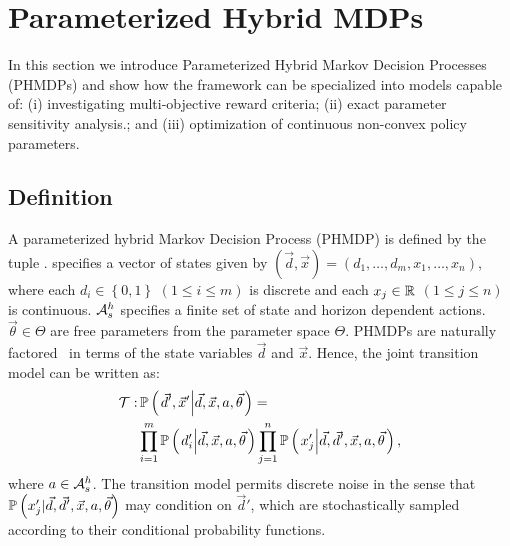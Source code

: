 \section{Parameterized Hybrid MDPs}
\label{sec:hybrid_mdps}

In this section we introduce Parameterized Hybrid Markov Decision Processes (PHMDPs) and show how the framework can be specialized into models capable of: (i) investigating multi-objective reward criteria; (ii) exact parameter sensitivity analysis.; and (iii) optimization of continuous non-convex policy parameters. 

\subsection{Definition}
\label{sec:phmdp_def}

A parameterized hybrid Markov Decision Process (PHMDP) is defined by the tuple {\footnotesize \PMDPTuple}. {\footnotesize \State} specifies a vector of states given by {\footnotesize $(\vec{d}, \vec{x}) =  \left( d_1, \ldots, d_m, x_1, \ldots, x_n \right) $}, where each {\footnotesize $ d_i \in \left\lbrace 0, 1 \right\rbrace $} {\footnotesize $\left( 1 \leq i \leq m \right)$} is discrete and each {\footnotesize$ x_j \in \mathbb{R} $} {\footnotesize $\left( 1 \leq j \leq   n \right)$} is continuous. {\footnotesize $\mathcal{A}^{h}_{s}$} specifies a finite set of state and horizon dependent actions.  {\footnotesize $\vec{\theta} \in \Theta$} are free parameters from the parameter space {\footnotesize $ \Theta $}. PHMDPs are naturally factored~\parencite{Boutilier_JAIR_1999} in terms of the state variables {\footnotesize$\vec{d}$} and {\footnotesize
$\vec{x}$}. Hence, the joint transition model can be written as:
{\footnotesize
\abovedisplayskip=0pt
\belowdisplayskip=0pt
\begin{align}
    \label{eq:hmdp_tfunc}
    \mathcal{T} :& \, \mathbb{P}\left({ \left. \vec{d}', \vec{x}' \middle| \vec{d}, \vec{x}, a, \vec{\theta} \right.}\right) = \nonumber \\
    & \prod_{i=1}^{m} \mathbb{P}\left({ \left. d_i' \middle| \vec{d}, \vec{x}, a, \vec{\theta} \right. }\right) \prod_{j=1}^{n} \mathbb{P}\left({ \left. x_j' \middle| \vec{d}, \vec{d}', \vec{x}, a, \vec{\theta} \right. }\right),
\end{align}   
}
where {\footnotesize $ a \in \mathcal{A}^{h}_{s} $}. The transition model permits discrete noise in the sense that {\footnotesize $ \mathbb{P}\left({ x_j' | \vec{d}, \vec{d}', \vec{x}, a, \vec{\theta} }\right) $} may condition on $ \vec{d}' $, which are stochastically sampled according to their conditional probability functions. 

